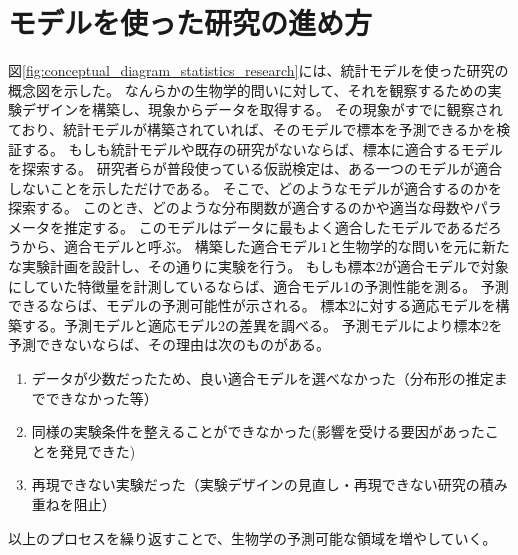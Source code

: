 \chapter{モデルを使った研究の進め方}

図\ref{fig:conceptual_diagram_statistics_research}には、統計モデルを使った研究の概念図を示した。
なんらかの生物学的問いに対して、それを観察するための実験デザインを構築し、現象からデータを取得する。
その現象がすでに観察されており、統計モデルが構築されていれば、そのモデルで標本を予測できるかを検証する。
もしも統計モデルや既存の研究がないならば、標本に適合するモデルを探索する。
研究者らが普段使っている仮説検定は、ある一つのモデルが適合しないことを示しただけである。
そこで、どのようなモデルが適合するのかを探索する。
このとき、どのような分布関数が適合するのかや適当な母数やパラメータを推定する。
このモデルはデータに最もよく適合したモデルであるだろうから、適合モデルと呼ぶ。
構築した適合モデル$1$と生物学的な問いを元に新たな実験計画を設計し、その通りに実験を行う。
もしも標本2が適合モデルで対象にしていた特徴量を計測しているならば、適合モデル1の予測性能を測る。
予測できるならば、モデルの予測可能性が示される。
標本2に対する適応モデルを構築する。予測モデルと適応モデル2の差異を調べる。
予測モデルにより標本2を予測できないならば、その理由は次のものがある。
\begin{enumerate}
    \item データが少数だったため、良い適合モデルを選べなかった（分布形の推定までできなかった等）
    \item 同様の実験条件を整えることができなかった(影響を受ける要因があったことを発見できた)
    \item 再現できない実験だった（実験デザインの見直し・再現できない研究の積み重ねを阻止）
\end{enumerate}

以上のプロセスを繰り返すことで、生物学の予測可能な領域を増やしていく。

